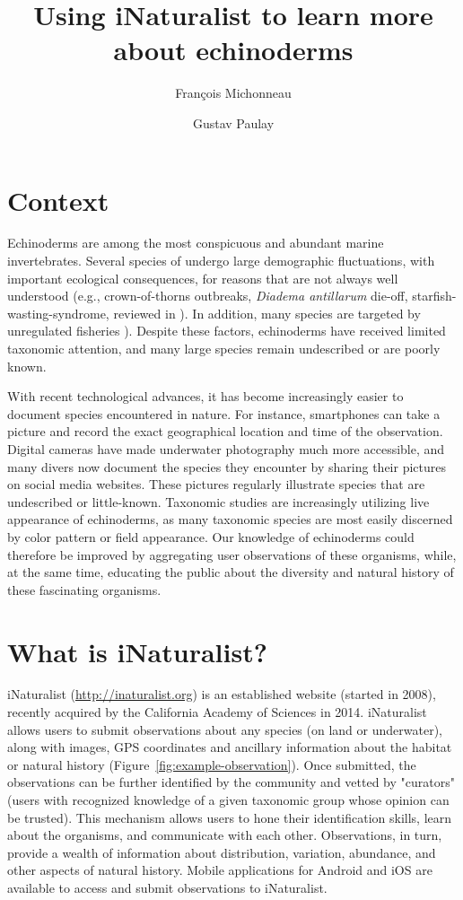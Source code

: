 \documentclass[11pt]{article}\usepackage[]{graphicx}\usepackage[]{color}
\title{Using iNaturalist to learn more about echinoderms}
\author{Fran\c{c}ois Michonneau}
\author{Gustav Paulay}
\affil{Florida Museum of Natural History, University of Florida, Gainesville,
  FL 32611-7800, USA; emails: francois.michonneau@gmail.com, paulay@flmnh.ufl.edu}
\date{}
\begin{document}
\maketitle


\section*{Context}

Echinoderms are among the most conspicuous and abundant marine
invertebrates. Several species of undergo large demographic fluctuations, with
important ecological consequences, for reasons that are not always well
understood (e.g., crown-of-thorns outbreaks, \textit{Diadema antillarum}
die-off, starfish-wasting-syndrome, reviewed in \citealt{Uthicke2009}). In
addition, many species are targeted by unregulated fisheries
\citep[e.g.][]{Purcell2014}). Despite these factors, echinoderms have received
limited taxonomic attention, and many large species remain undescribed or are
poorly known.

With recent technological advances, it has become increasingly easier to
document species encountered in nature. For instance, smartphones can take a
picture and record the exact geographical location and time of the
observation. Digital cameras have made underwater photography much more
accessible, and many divers now document the species they encounter by sharing
their pictures on social media websites. These pictures regularly illustrate
species that are undescribed or little-known. Taxonomic studies are increasingly
utilizing live appearance of echinoderms, as many taxonomic species are most
easily discerned by color pattern or field appearance. Our knowledge of
echinoderms could therefore be improved by aggregating user observations of
these organisms, while, at the same time, educating the public about the
diversity and natural history of these fascinating organisms.

\section*{What is iNaturalist?}

iNaturalist (\href{http://inaturalist.org}{http://inaturalist.org}) is an
established website (started in 2008), recently acquired by the California
Academy of Sciences in 2014. iNaturalist allows users to submit observations
about any species (on land or underwater), along with images, GPS coordinates
and ancillary information about the habitat or natural history
(Figure~\ref{fig:example-observation}). Once submitted, the observations can be
further identified by the community and vetted by "curators" (users with
recognized knowledge of a given taxonomic group whose opinion can be
trusted). This mechanism allows users to hone their identification skills, learn
about the organisms, and communicate with each other. Observations, in turn,
provide a wealth of information about distribution, variation, abundance, and
other aspects of natural history. Mobile applications for Android and iOS are
available to access and submit observations to iNaturalist.
\end{document}
